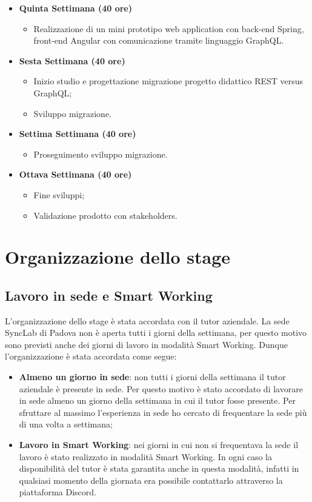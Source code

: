 \begin{itemize}
    \item \textbf{Quinta Settimana (40 ore)}
    \begin{itemize}
        \item Realizzazione di un mini prototipo web application con back-end Spring, front-end Angular con comunicazione tramite linguaggio GraphQL.
    \end{itemize}
    \item \textbf{Sesta Settimana (40 ore)}
    \begin{itemize}
        \item Inizio studio e progettazione migrazione progetto didattico REST versus GraphQL;
        \item Sviluppo migrazione.
    \end{itemize}
    \item \textbf{Settima Settimana (40 ore)}
    \begin{itemize}
        \item Proseguimento sviluppo migrazione.
    \end{itemize}
    \item \textbf{Ottava Settimana (40 ore)}
    \begin{itemize}
        \item Fine sviluppi;
        \item Validazione prodotto con stakeholders.
    \end{itemize}
\end{itemize}
\section{Organizzazione dello stage}
\subsection*{Lavoro in sede e Smart Working}
L'organizzazione dello stage è stata accordata con il tutor aziendale. La sede SyncLab di Padova non è aperta tutti i giorni della settimana, per questo motivo sono previsti anche dei giorni di lavoro in modalità Smart Working. Dunque l'organizzazione è stata accordata come segue:
\begin{itemize}
  \item \textbf{Almeno un giorno in sede}: non tutti i giorni della settimana il tutor aziendale è presente in sede. Per questo motivo è stato accordato di lavorare in sede almeno un giorno della settimana in cui il tutor fosse presente. Per sfruttare al massimo l'esperienza in sede ho cercato di frequentare la sede più di una volta a settimana;
  \item \textbf{Lavoro in Smart Working}: nei giorni in cui non si frequentava la sede il lavoro è stato realizzato in modalità Smart Working. In ogni caso la disponibilità del tutor è stata garantita anche in questa modalità, infatti in qualsiasi momento della giornata era possibile contattarlo attraverso la piattaforma Discord.
\end{itemize}
